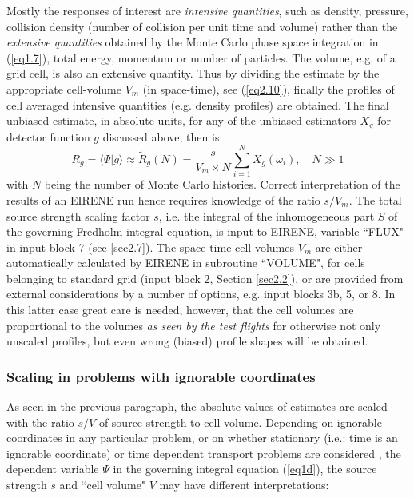 Mostly the responses of interest are \emph{intensive quantities}, such as density, pressure, collision density (number
of collision per unit time and volume) rather than
the \emph{extensive quantities} obtained by the Monte Carlo phase space integration in (\ref{eq1.7}), total energy, momentum or
number of particles.  The volume, e.g. of a grid cell, is also an extensive quantity. Thus by dividing the estimate by the appropriate cell-volume $V_m$ (in space-time), see (\ref{eq2.10}), finally the
profiles of cell averaged intensive quantities (e.g. density profiles) are obtained.
The final unbiased estimate, in absolute units, for any of the unbiased estimators $X_g$ for detector function $g$ discussed above, then is:
\begin{equation} \label{eq1.8b}
R_g  =\langle\Psi|g\rangle \approx   \tilde{R}_g(N)   =    \frac{s}{ V_m\times N} \sum_{i=1}^{N}   X_g(
\omega_i) , \quad N \gg 1
\end{equation}
with $N$ being the number of Monte Carlo histories.
Correct interpretation of the results of an EIRENE run hence requires knowledge of the
ratio $s/V_m$.
The total source strength scaling factor $s$, i.e. the integral of the
inhomogeneous part $S$ of the governing Fredholm integral equation, is input to EIRENE,
variable ``FLUX" in input block 7 (see \ref{sec2.7}). The space-time cell volumes $V_m$ are either automatically calculated by EIRENE
in subroutine ``VOLUME", for cells belonging to standard grid (input block 2, Section \ref{sec2.2}), or are provided from external considerations
by a number of options, e.g. input blocks 3b, 5, or 8.
In this latter case great care is needed, however, that the cell volumes are proportional to the volumes
\emph{as seen by the test flights} for otherwise not only unscaled profiles, but even wrong (biased) profile shapes will be obtained.

\subsubsection{Scaling in problems with ignorable coordinates}\label{sec1.2.0a}
As seen in the previous paragraph, the absolute values of estimates are scaled
with the ratio $s/V$ of source strength to cell volume. Depending on ignorable coordinates in any particular problem,
or on whether stationary (i.e.: time is an ignorable coordinate) or time dependent transport problems are considered ,
the dependent variable $\Psi$
in the governing integral equation (\ref{eq1d}),
the source strength $s$ and ``cell volume" $V$ may have different interpretations:
